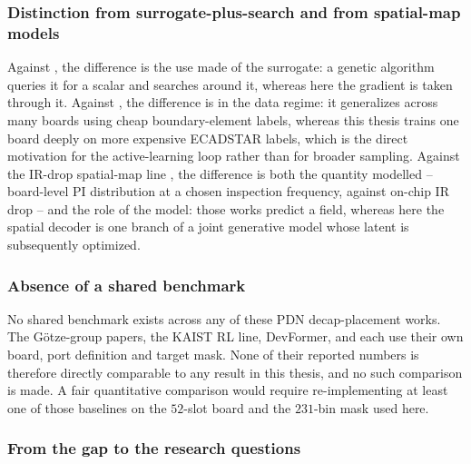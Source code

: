 \subsubsection*{Distinction from surrogate-plus-search and from spatial-map models}

Against \cite{convga2024gcn}, the difference is the use made of the surrogate:
a genetic algorithm queries it for a scalar and searches around it, whereas here
the gradient is taken through it. Against \cite{zhang2021fast}, the difference is
in the data regime: it generalizes across many boards using cheap boundary-element
labels, whereas this thesis trains one board deeply on more expensive ECADSTAR
labels, which is the direct motivation for the active-learning loop rather than
for broader sampling. Against the IR-drop spatial-map line
\cite{chhabria2021iredge, zhao2024pdnnet, gif2026conditional}, the difference is
both the quantity modelled -- board-level PI distribution at a chosen inspection
frequency, against on-chip IR drop -- and the role of the model: those works
predict a field, whereas here the spatial decoder is one branch of a joint
generative model whose latent is subsequently optimized.

\subsubsection*{Absence of a shared benchmark}

No shared benchmark exists across any of these PDN decap-placement works. The
Götze-group papers, the KAIST RL line, DevFormer, \cite{convga2024gcn} and
\cite{zhang2021fast} each use their own board, port definition and target mask.
None of their reported numbers is therefore directly comparable to any result in
this thesis, and no such comparison is made. A fair quantitative comparison would
require re-implementing at least one of those baselines on the $52$-slot board and
the $231$-bin mask used here.

\subsubsection*{From the gap to the research questions}


